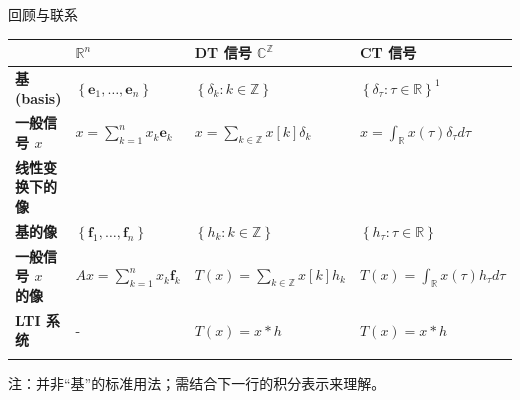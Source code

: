 \documentclass[
  ignorenonframetext,
]{beamer}
\newcounter{none} %
\begin{document}
\begin{frame}{回顾与联系}
\protect{}\label{ux56deux987eux4e0eux8054ux7cfb}
{\def\LTcaptype{none} %
\begin{longtable}[]{@{}
  >{\raggedright\arraybackslash}p{}
  >{\raggedright\arraybackslash}p{}
  >{\raggedright\arraybackslash}p{}
  >{\raggedright\arraybackslash}p{}@{}}
\toprule\noalign{}
\begin{minipage}[b]{\linewidth}\raggedright
\end{minipage} & \begin{minipage}[b]{\linewidth}\raggedright
\(\mathbb{R}^{n}\)
\end{minipage} & \begin{minipage}[b]{\linewidth}\raggedright
DT 信号 \(\mathbb{C}^{\mathbb{Z}}\)
\end{minipage} & \begin{minipage}[b]{\linewidth}\raggedright
CT 信号
\end{minipage} \\
\midrule\noalign{}
\endhead
\textbf{基 (basis)} &
\(\left\{\mathbf{e}_{1}, \ldots, \mathbf{e}_{n}\right\}\) &
\(\left\{\delta_{k}: k \in \mathbb{Z}\right\}\) &
\(\left\{\delta_{\tau}: \tau \in \mathbb{R}\right\}^{1}\) \\
\textbf{一般信号 \(x\)} & \(x=\sum_{k=1}^{n} x_{k} \mathbf{e}_{k}\) &
\(x=\sum_{k \in \mathbb{Z}} x[k] \delta_{k}\) &
\(x=\int_{\mathbb{R}} x(\tau) \delta_{\tau} d \tau\) \\
\textbf{线性变换下的像} & & & \\
\textbf{基的像} &
\(\left\{\mathbf{f}_{1}, \ldots, \mathbf{f}_{n}\right\}\) &
\(\left\{h_{k}: k \in \mathbb{Z}\right\}\) &
\(\left\{h_{\tau}: \tau \in \mathbb{R}\right\}\) \\
\textbf{一般信号 \(x\) 的像} &
\(A x=\sum_{k=1}^{n} x_{k} \mathbf{f}_{k}\) &
\(T(x)=\sum_{k \in \mathbb{Z}} x[k] h_{k}\) &
\(T(x)=\int_{\mathbb{R}} x(\tau) h_{\tau} d \tau\) \\
\textbf{LTI 系统} & - & \(T(x)=x * h\) & \(T(x)=x * h\) \\
\bottomrule\noalign{}
\end{longtable}
}

注：并非``基''的标准用法；需结合下一行的积分表示来理解。
\end{frame}
\end{document}
